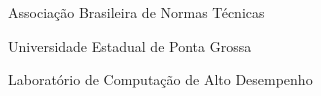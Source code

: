 \item[ABNT] Associação Brasileira de Normas Técnicas
\item[UEPG] Universidade Estadual de Ponta Grossa
\item[LCAD] Laboratório de Computação de Alto Desempenho